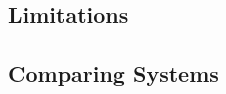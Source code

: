 \subsection{Limitations}
\label{sec:limitations}

\subsection{Comparing Systems}
\label{sec:rw-compare}
